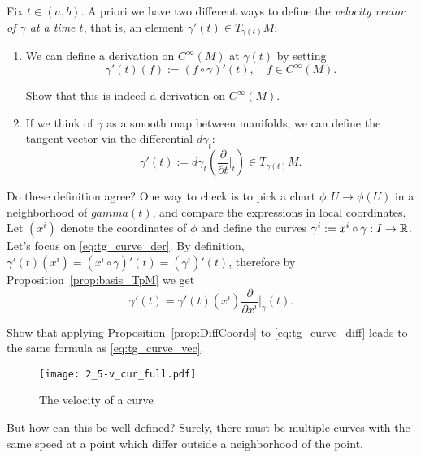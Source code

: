 Fix $t\in(a,b)$. 
A priori we have two different ways to define the \emph{velocity vector of $\gamma$ at a time $t$}, that is, an element $\gamma'(t) \in T_{\gamma(t)}M$:
\begin{enumerate}
    \item We can define a derivation on $C^\infty(M)$ at $\gamma(t)$ by setting
    \begin{equation}\label{eq:tg_curve_der}
        \gamma'(t) (f) := (f\circ\gamma)'(t), \quad f\in C^\infty(M).
    \end{equation}
    \begin{exe}
        Show that this is indeed a derivation on $C^\infty(M)$.
    \end{exe}
    \item If we think of $\gamma$ as a smooth map between manifolds, we can define the tangent vector via the differential $d\gamma_t$:
    \begin{equation}\label{eq:tg_curve_diff}
        \gamma'(t):= d\gamma_t\left(\frac{\partial}{\partial t}\Big|_t\right) \in T_{\gamma(t)}M.
    \end{equation}
\end{enumerate}

Do these definition agree?
One way to check is to pick a chart $\phi: U \to \phi(U)$ in a neighborhood of $gamma(t)$, and compare the expressions in local coordinates. Let $(x^i)$ denote the coordinates of $\phi$ and define the curves $\gamma^i := x^i \circ \gamma : I\to\mathbb{R}$.
Let's focus on \eqref{eq:tg_curve_der}. By definition, $\gamma'(t)(x^i) = (x^i\circ\gamma)'(t) = (\gamma^i)'(t)$, therefore by Proposition~\ref{prop:basis_TpM} we get
\begin{equation}\label{eq:tg_curve_vec}
    \gamma'(t) = %
        \gamma'(t)(x^i) \frac{\partial}{\partial x^i}\Big|_\gamma(t).
\end{equation}
\begin{exe}
    Show that applying Proposition~\ref{prop:DiffCoords} to \eqref{eq:tg_curve_diff} leads to the same formula as \eqref{eq:tg_curve_vec}.
\end{exe}

\begin{figure*}[htp]
    \centering
    \texttt{[image: 2\_5-v\_cur\_full.pdf]}
    \caption{The velocity of a curve}
    \label{fig:2_5-v_cur_full}
\end{figure*}

But how can this be well defined? Surely, there must be multiple curves with the same speed at a point which differ outside a neighborhood of the point.

